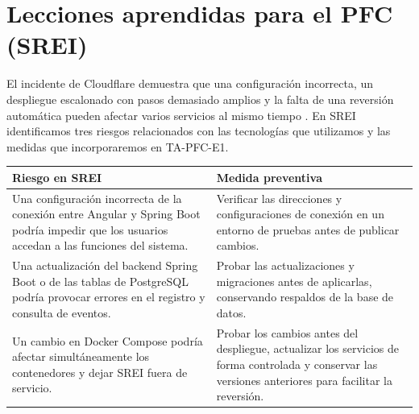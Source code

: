 
\section{Lecciones aprendidas para el PFC (SREI)}

El incidente de Cloudflare demuestra que una
configuración incorrecta, un despliegue escalonado con
pasos demasiado amplios y la falta de una reversión
automática pueden afectar varios servicios
al mismo tiempo \cite{cloudflare2022}. En SREI
identificamos tres riesgos relacionados con las
tecnologías que utilizamos y las medidas que
incorporaremos en TA-PFC-E1.

\begin{table}[htbp]
\centering
\small
\begin{tabularx}{\linewidth}{@{}L L@{}}
\toprule
\textbf{Riesgo en SREI} & \textbf{Medida preventiva} \\
\midrule
Una configuración incorrecta de la conexión entre
Angular y Spring Boot podría impedir que los usuarios
accedan a las funciones del sistema.
&
Verificar las direcciones y configuraciones de conexión
en un entorno de pruebas antes de publicar cambios.
\\
\addlinespace
Una actualización del backend Spring Boot o de las
tablas de PostgreSQL podría provocar errores en el
registro y consulta de eventos.
&
Probar las actualizaciones y migraciones antes de
aplicarlas, conservando respaldos de la base de datos.
\\
\addlinespace
Un cambio en Docker Compose podría afectar
simultáneamente los contenedores y dejar SREI
fuera de servicio.
&
Probar los cambios antes del despliegue, actualizar
los servicios de forma controlada y conservar las
versiones anteriores para facilitar la reversión.
\\
\bottomrule
\end{tabularx}
\end{table}
